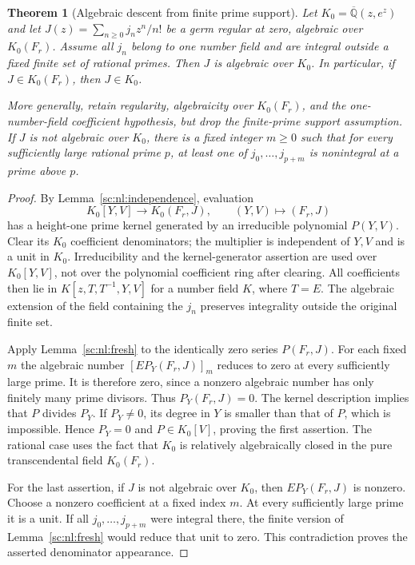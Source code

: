 \documentclass[11pt,a4paper]{article}
\newtheorem{theorem}{Theorem}[section]
\theoremstyle{definition}
\theoremstyle{remark}
\theoremstyle{plain}
\numberwithin{equation}{section}
\begin{document}
\begin{theorem}[Algebraic descent from finite prime support]
\label{sc:nl:descent}
Let $K_0=\overline{\mathbb Q}(z,e^z)$ and let
$J(z)=\sum_{n\ge0}j_nz^n/n!$ be a germ regular at zero, algebraic over
$K_0(F_r)$. Assume all $j_n$ belong to one number field and are
integral outside a fixed finite set of rational primes. Then $J$ is
algebraic over $K_0$. In particular, if $J\in K_0(F_r)$, then $J\in K_0$.

More generally, retain regularity, algebraicity over $K_0(F_r)$, and
the one-number-field coefficient hypothesis, but drop the finite-prime
support assumption. If $J$ is not algebraic over $K_0$, there is a fixed
integer $m\ge0$ such that for every sufficiently large rational prime $p$,
at least one of $j_0,\ldots,j_{p+m}$ is nonintegral at a prime above $p$.
\end{theorem}
\begin{proof}
By Lemma~\ref{sc:nl:independence}, evaluation
\[
 K_0[Y,V]\longrightarrow K_0(F_r,J),\qquad(Y,V)\longmapsto(F_r,J)
\]
has a height-one prime kernel generated by an irreducible polynomial
$P(Y,V)$. Clear its $K_0$ coefficient denominators; the multiplier is
independent of $Y,V$ and is a unit in $K_0$. Irreducibility and the
kernel-generator assertion are used over $K_0[Y,V]$, not over the
polynomial coefficient ring after clearing. All coefficients then lie in
$K[z,T,T^{-1},Y,V]$ for a number field $K$, where $T=E$.
The algebraic extension of the field containing the $j_n$ preserves
integrality outside the original finite set.

Apply Lemma~\ref{sc:nl:fresh} to the identically zero series
$P(F_r,J)$. For each fixed $m$ the algebraic number
$[E P_Y(F_r,J)]_m$ reduces to zero at every sufficiently large prime.
It is therefore zero, since a nonzero algebraic number has only
finitely many prime divisors. Thus $P_Y(F_r,J)=0$.
The kernel description implies that $P$ divides $P_Y$. If $P_Y\ne0$,
its degree in $Y$ is smaller than that of $P$, which is impossible.
Hence $P_Y=0$ and $P\in K_0[V]$, proving the first assertion.
The rational case uses the fact that $K_0$ is relatively algebraically
closed in the pure transcendental field $K_0(F_r)$.

For the last assertion, if $J$ is not algebraic over $K_0$, then
$E P_Y(F_r,J)$ is nonzero. Choose a nonzero coefficient at a fixed
index $m$. At every sufficiently large prime it is a unit. If all
$j_0,\ldots,j_{p+m}$ were integral there, the finite version of
Lemma~\ref{sc:nl:fresh} would reduce that unit to zero. This contradiction
proves the asserted denominator appearance.
\end{proof}
\end{document}
